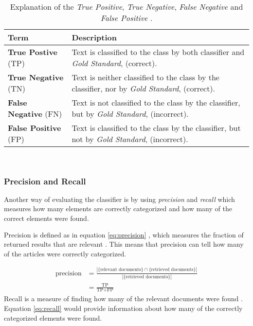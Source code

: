 \begin{table}[ht]
\centering
\renewcommand{\arraystretch}{1.25}
\begin{tabularx}{\textwidth}{l |X}
\textbf{Term}  & \textbf{Description} \\\hline
\textbf{True Postive} (TP) & Text is classified to the class by both classifier and \emph{Gold Standard}, (correct). \\ \hline
\textbf{True Negative} (TN) &  Text is neither classified to the class by the classifier, nor by \emph{Gold Standard}, (correct).  \\ \hline
\textbf{False Negative} (FN) & Text is not classified to the class by the classifier, but by \emph{Gold Standard}, (incorrect). \\ \hline
\textbf{False Positive} (FP) & Text is classified to the class by the classifier, but not by \emph{Gold Standard}, (incorrect).
\end{tabularx}
\\[10pt]
\caption[Explanation of the \emph{TP}, \emph{TN}, \emph{FN} and \emph{FP}]{Explanation of the \emph{True Positive}, \emph{True Negative}, \emph{False Negative} and \emph{False Positive} \cite[p.~330-331]{iirbook}.}
\label{tab:retrievedescription}
\end{table}

\subsubsection{Precision and Recall}
Another way of evaluating the classifier is by using \emph{precision} and \emph{recall} which measures how many elements are correctly categorized and how many of the correct elements were found. 


Precision is defined as in equation \ref{eq:precision} \cite{wiki:precisionrecall}, which measures the fraction of returned results that are relevant \cite[p.~5]{iirbook}. This means that precision can tell how many of the articles were correctly categorized. 

\begin{equation} \label{eq:precision} 
\begin{split}
\text{precision} & =\frac{|\{\text{relevant documents}\}\cap\{\text{retrieved documents}\}|}{|\{\text{retrieved documents}\}|} \\
 & = \frac{\text{TP}}{\text{TP} + \text{FP}}
 \end{split}
\end{equation}
Recall is a measure of finding how many of the relevant documents were found \cite[p.~5]{iirbook}. Equation \ref{eq:recall} \cite{wiki:precisionrecall} would provide information about how many of the correctly categorized elements were found. 

